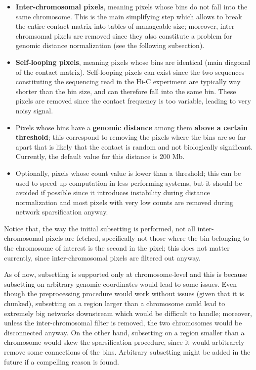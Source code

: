 \begin{itemize}\tightlist
  \item \textbf{Inter-chromosomal pixels}, meaning pixels whose bins do not fall into the same chromosome. This is the main simplifying step which allows to break the entire contact matrix into tables of manageable size; moreover, inter-chromsomal pixels are removed since they also constitute a problem for genomic distance normalization (see the following subsection).
  \item \textbf{Self-looping pixels}, meaning pixels whose bins are identical (main diagonal of the contact matrix). Self-looping pixels can exist since the two sequences constituting the sequencing read in the Hi-C experiment are typically way shorter than the bin size, and can therefore fall into the same bin. These pixels are removed since the contact frequency is too variable, leading to very noisy signal.
  \item Pixels whose bins have a \textbf{genomic distance} among them \textbf{above a certain threshold}; this correspond to removing the pixels where the bins are so far apart that is likely that the contact is random and not biologically significant. Currently, the default value for this distance is 200 Mb. %
  \item Optionally, pixels whose count value is lower than a threshold; this can be used to speed up computation in less performing systems, but it should be avoided if possible since it introduces instability during distance normalization and most pixels with very low counts are removed during network sparsification anyway.
\end{itemize}

Notice that, the way the initial subsetting is performed, not all inter-chromosomal pixels are fetched, specifically not those where the bin belonging to the chromosome of interest is the second in the pixel; this does not matter currently, since inter-chromosomal pixels are filtered out anyway. 

As of now, subsetting is supported only at chromosome-level and this is because subsetting on arbitrary genomic coordinates would lead to some issues. Even though the preprocessing procedure would work without issues (given that it is chunked), subsetting on a region larger than a chromosome could lead to extremely big networks downstream which would be difficult to handle; moreover, unless the inter-chromosomal filter is removed, the two chromosomes would be disconnected anyway. On the other hand, subsetting on a region smaller than a chromosome would skew the sparsification procedure, since it would arbitrarely remove some connections of the bins. Arbitrary subsetting might be added in the future if a compelling reason is found.

